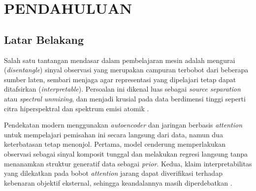 
\chapter{PENDAHULUAN}

\section{Latar Belakang}

Salah satu tantangan mendasar dalam pembelajaran mesin adalah mengurai (\textit{disentangle}) sinyal observasi yang merupakan campuran terbobot dari beberapa sumber laten, sembari menjaga agar representasi yang dipelajari tetap dapat ditafsirkan (\textit{interpretable}). Persoalan ini dikenal luas sebagai \textit{source separation} atau \textit{spectral unmixing}, dan menjadi krusial pada data berdimensi tinggi seperti citra hiperspektral dan spektrum emisi atomik \citep{palsson_hyperspectral_2018, ghosh_hyperspectral_2022}.

Pendekatan modern menggunakan \textit{autoencoder} dan jaringan berbasis \textit{attention} untuk mempelajari pemisahan ini secara langsung dari data, namun dua keterbatasan tetap menonjol. Pertama, model cenderung memperlakukan observasi sebagai sinyal komposit tunggal dan melakukan regresi langsung tanpa menanamkan struktur generatif data sebagai \textit{prior}. Kedua, klaim interpretabilitas yang dilekatkan pada bobot \textit{attention} jarang dapat diverifikasi terhadap kebenaran objektif eksternal, sehingga keandalannya masih diperdebatkan \citep{jain_attention_2019, wiegreffe_attention_2019, bibal_attention_2022}.


